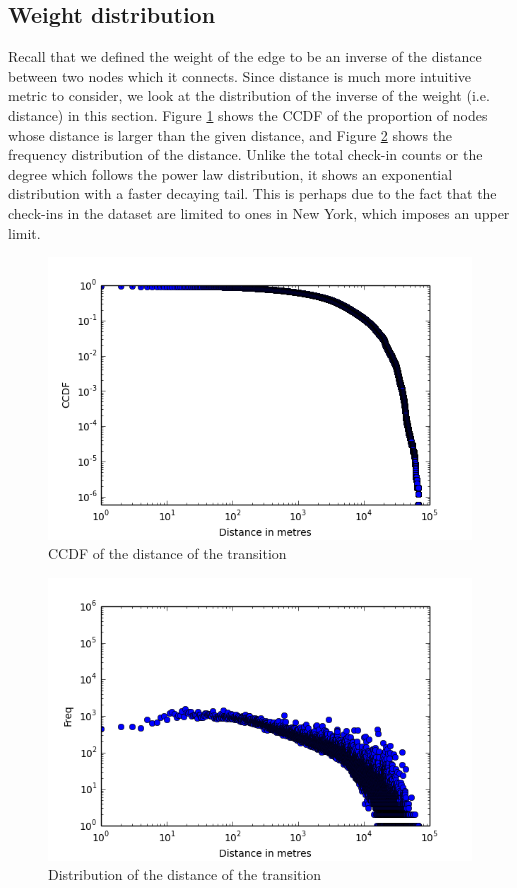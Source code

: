 \subsection{Weight distribution}
Recall that we defined the weight of the edge to be an inverse of the distance between two nodes which it connects.
Since distance is much more intuitive metric to consider, we look at the distribution of the inverse of the weight (i.e. distance) in this section.
Figure \ref{fig:distance-ccdf} shows the CCDF of the proportion of nodes whose distance is larger than the given distance, and Figure \ref{fig:distance-distribution} shows the frequency distribution of the distance.
Unlike the total check-in counts or the degree which follows the power law distribution, it shows an exponential distribution with a faster decaying tail.
This is perhaps due to the fact that the check-ins in the dataset are limited to ones in New York, which imposes an upper limit.
\begin{figure}
\centering
\includegraphics[scale=0.5]{../distance_metres_ccdf.png}
\caption{CCDF of the distance of the transition}
\label{fig:distance-ccdf}
\end{figure}
\begin{figure}
\centering
\includegraphics[scale=0.5]{../distance_metres_distribution.png}
\caption{Distribution of the distance of the transition}
\label{fig:distance-distribution}
\end{figure}
